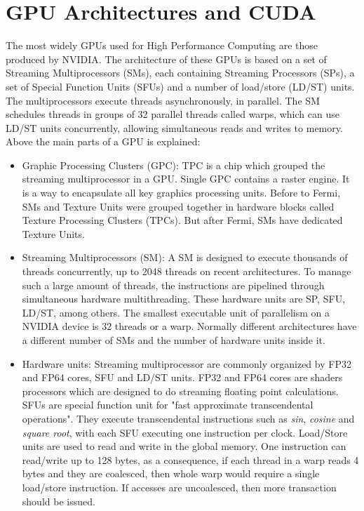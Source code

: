 \section{GPU Architectures and CUDA}\label{sec:GPUsCUDA}
The most widely GPUs used for High Performance Computing are those produced by NVIDIA. The architecture of these GPUs is based on a set of Streaming Multiprocessors (SMs), each containing Streaming Processors (SPs), a set of Special Function Units (SFUs) and a number of load/store (LD/ST) units. The multiprocessors execute threads asynchronously, in parallel. The SM schedules threads in groups of 32 parallel threads called warps, which can use LD/ST units concurrently, allowing simultaneous reads and writes to memory. Above the main parts of a GPU is explained:

\begin{itemize}
    \item Graphic Processing Clusters (GPC): TPC is a chip which grouped the streaming multiprocessor in a GPU. Single GPC contains a raster engine. It is a way to encapsulate all key graphics processing units. Before to Fermi, SMs and Texture Units were grouped together in hardware blocks called Texture Processing Clusters (TPCs). But after Fermi, SMs have dedicated Texture Units. 
    
    \item Streaming Multiprocessors (SM): A SM is designed to execute thousands of threads concurrently, up to 2048 threads on recent architectures. To manage such a large amount of threads, the instructions are pipelined through simultaneous hardware multithreading. These hardware units are SP, SFU, LD/ST, among others. The smallest executable unit of parallelism on a NVIDIA device is 32 threads or a warp. Normally different architectures have a different number of SMs and the number of hardware units inside it. 
    
    \item Hardware units: Streaming multiprocessor are commonly organized by FP32 and FP64 cores, SFU and LD/ST units. FP32 and FP64 cores are shaders processors which are designed to do streaming floating point calculations. SFUs are special function unit for "fast approximate transcendental operations". They execute transcendental instructions such as \textit{sin}, \textit{cosine} and \textit{square root}, with each SFU executing one instruction per clock. Load/Store units are used to read and write in the global memory. One instruction can read/write up to 128 bytes, as a consequence, if each thread in a warp reads 4 bytes and they are coalesced, then whole warp would require a single load/store instruction. If accesses are uncoalesced, then more transaction should be issued.
    
\end{itemize}

